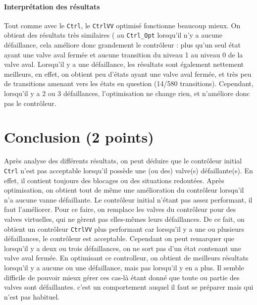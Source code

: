 \documentclass[a4paper]{book}
\begin{document}
\paragraph{Interprétation des résultats}
Tout comme avec le {\tt Ctrl}, le {\tt CtrlVV} optimisé fonctionne beaucoup mieux. 
On obtient des résultats très similaires ( au {\tt Ctrl\_Opt} lorsqu'il n'y a aucune défaillance, cela améliore donc grandement le contrôleur : plus qu'un seul état ayant une valve aval fermée et aucune 
transition du niveau 1 au niveau 0 de la valve aval. Lorsqu'il y a une défaillance, les résultats sont également nettement meilleurs, 
en effet, on obtient peu d'états ayant une valve aval fermée, et très peu de transitions amenant vers les états en question (14/580 transitions).
Cependant, lorsqu'il y a 2 ou 3 défaillances, l'optimisation ne change rien, et n'améliore donc pas le contrôleur. 

\section{Conclusion (2 points)}
Après analyse des différents résultats, on peut déduire que le contrôleur initial {\tt Ctrl} n'est pas acceptable lorsqu'il possède une (ou des) valve(s) défaillante(s). 
En effet, il  contient toujours des blocages ou des situations redoutées. Après optimisation, on obtient tout de même une amélioration du contrôleur lorsqu'il n'a aucune vanne défaillante.
Le contrôleur initial n’étant pas assez performant, il faut l'améliorer. Pour ce faire, on remplace les valves du contrôleur pour des valves virtuelles, qui ne gèrent 
pas elles-mêmes leurs défaillances. De ce fait, on obtient un contrôleur {\tt CtrlVV} plus performant car lorsqu'il y a une ou plusieurs défaillances, le contrôleur est acceptable.
Cependant on peut remarquer que lorsqu'il y a deux ou trois défaillances, on ne sort pas d'un état contenant une valve aval fermée. En optimisant ce controlleur, on obtient de meilleurs résultats lorsqu'il y a
aucune ou une défaillance, mais pas lorsqu'il y en a plus. Il semble difficile de pouvoir mieux gérer ces cas-là étant donné que toute ou partie des valves sont défaillantes. c'est un comportement auquel il 
faut se préparer mais qui n'est pas habituel.
\end{document}
